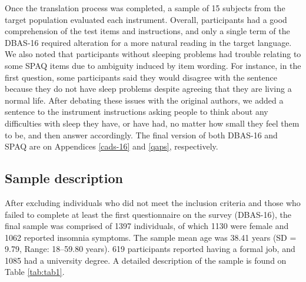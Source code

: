 \documentclass[
  ,doc,11pt, twoside,floatsintext]{apa6}
\begin{document}
Once the translation process was completed, a sample of 15 subjects from the target population evaluated each instrument. Overall, participants had a good comprehension of the test items and instructions, and only a single term of the DBAS-16 required alteration for a more natural reading in the target language. We also noted that participants without sleeping problems had trouble relating to some SPAQ items due to ambiguity induced by item wording. For instance, in the first question, some participants said they would disagree with the sentence because they do not have sleep problems despite agreeing that they are living a normal life. After debating these issues with the original authors, we added a sentence to the instrument instructions asking people to think about any difficulties with sleep they have, or have had, no matter how small they feel them to be, and then answer accordingly. The final version of both DBAS-16 and SPAQ are on Appendices \ref{cads-16} and \ref{qaps}, respectively.

\hypertarget{sample-description}{%
\subsection{Sample description}\label{sample-description}}

After excluding individuals who did not meet the inclusion criteria and those who failed to complete at least the first questionnaire on the survey (DBAS-16), the final sample was comprised of 1397 individuals, of which 1130 were female and 1062 reported insomnia symptoms. The sample mean age was 38.41 years (SD = 9.79, Range: 18--59.80 years). 619 participants reported having a formal job, and 1085 had a university degree. A detailed description of the sample is found on Table \ref{tab:tab1}.
\end{document}
